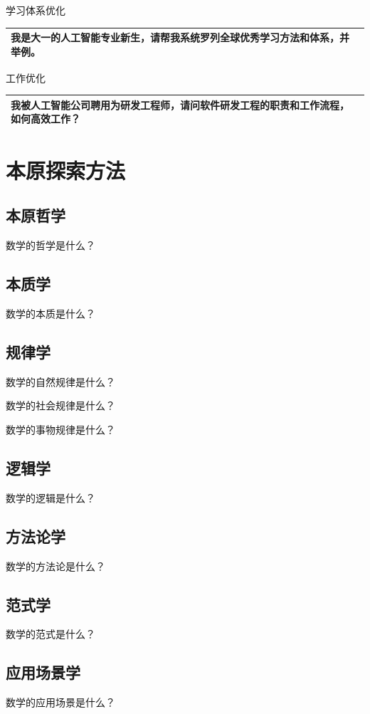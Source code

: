 \documentclass[12pt]{book}
\begin{document}
\bigskip
学习体系优化

\begin{tabular}{|p{15cm}|p{3cm}|}
	\hline
我是大一的人工智能专业新生，请帮我系统罗列全球优秀学习方法和体系，并举例。\\
	\hline
\end{tabular}


\bigskip
工作优化

\begin{tabular}{|p{15cm}|p{3cm}|}
	\hline
我被人工智能公司聘用为研发工程师，请问软件研发工程的职责和工作流程，如何高效工作？\\
	\hline
\end{tabular}
\chapter{本原探索方法}
\section{本原哲学}
{数学}的哲学是什么？

\section{本质学}
{数学}的本质是什么？

\section{规律学}
{数学}的自然规律是什么？

{数学}的社会规律是什么？

{数学}的事物规律是什么？

\section{逻辑学}
{数学}的逻辑是什么？

\section{方法论学}
{数学}的方法论是什么？


\section{范式学}
{数学}的范式是什么？

\section{应用场景学}
{数学}的应用场景是什么？
\end{document}
